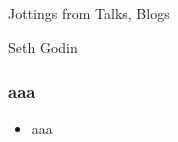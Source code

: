 \begin{frame}[fragile]\frametitle{}
\begin{center}
{\Large Jottings from Talks, Blogs}

{\small Seth Godin}


\end{center}
\end{frame}


\begin{frame}[fragile]\frametitle{aaa}

	\begin{itemize}
	\item aaa
	\end{itemize}

\end{frame}
